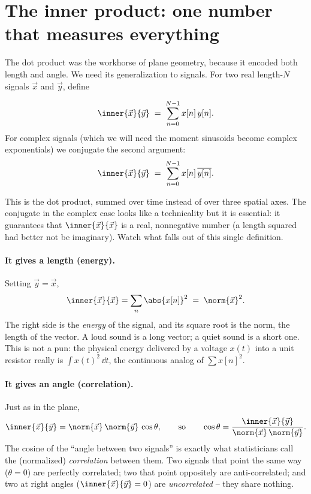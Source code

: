 \section{The inner product: one number that measures everything}
\label{ch03:inner}

The dot product was the workhorse of plane geometry, because it encoded both length and angle. We
need its generalization to signals. For two real length-$N$ signals $\vec{x}$ and $\vec{y}$, define

\begin{definition}
\label{ch03:def-inner}
\[
  \inner{\vec{x}}{\vec{y}} \;=\; \sum_{n=0}^{N-1} x[n]\, y[n].
\]
For complex signals (which we will need the moment sinusoids become complex exponentials) we
conjugate the second argument:
\[
  \inner{\vec{x}}{\vec{y}} \;=\; \sum_{n=0}^{N-1} x[n]\, \overline{y[n]} .
\]
\end{definition}

This is the dot product, summed over time instead of over three spatial axes. The conjugate in the
complex case looks like a technicality but it is essential: it guarantees that
$\inner{\vec{x}}{\vec{x}}$ is a real, nonnegative number (a length squared had better not be
imaginary). Watch what falls out of this single definition.

\paragraph{It gives a length (energy).} Setting $\vec{y}=\vec{x}$,
\[
  \inner{\vec{x}}{\vec{x}} = \sum_{n} \abs{x[n]}^2 \;=\; \norm{\vec{x}}^2 .
\]
The right side is the \emph{energy} of the signal, and its square root is the norm, the length of the
vector. A loud sound is a long vector; a quiet sound is a short one. This is not a pun: the physical
energy delivered by a voltage $x(t)$ into a unit resistor really is $\int x(t)^2\,\dd t$, the
continuous analog of $\sum x[n]^2$.

\paragraph{It gives an angle (correlation).} Just as in the plane,
\[
  \inner{\vec{x}}{\vec{y}} = \norm{\vec{x}}\,\norm{\vec{y}}\,\cos\theta,
  \qquad\text{so}\qquad
  \cos\theta = \frac{\inner{\vec{x}}{\vec{y}}}{\norm{\vec{x}}\,\norm{\vec{y}}}.
\]
The cosine of the ``angle between two signals'' is exactly what statisticians call the (normalized)
\emph{correlation} between them. Two signals that point the same way ($\theta=0$) are perfectly
correlated; two that point oppositely are anti-correlated; and two at right angles
($\inner{\vec{x}}{\vec{y}}=0$) are \emph{uncorrelated} -- they share nothing.

